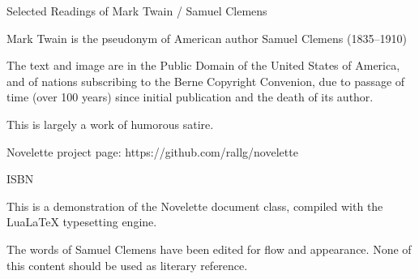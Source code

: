 \documentclass[../interior-demo.tex]{subfiles}
\begin{document}
\begin{display} %
\null\null\null\null\null
{} %
\null\null\null
{}
\vfill %
\end{display}

\begin{display} %
\vfill %
{\centering Selected Readings of Mark Twain\br
/ Samuel Clemens\par}
\null %
{\centering Mark Twain is the pseudonym of American\br
author Samuel Clemens (1835--1910)\par}
\null
{\centering The text and image are in the Public Domain\br
of the United States of America, and of nations\br
subscribing to the Berne Copyright Convenion,\br
due to passage of time (over 100 years) since\br
initial publication and the death of its author.\par}
\null
{\centering This is largely a work of humorous satire.\par}
\null
{\centering Novelette project page:\br
https://github.com/rallg/novelette\par}
\null
{\centering ISBN \par} %
\end{display}


\begin{display} %
\vfil
{}
\null\null\null\null
\begin{blockindent}[2,2]
This is a demonstration of the Novelette document class, compiled
with the LuaLaTeX typesetting engine.\par
\null
The words of Samuel Clemens
have been edited for flow and appearance. None of this content
should be used as literary reference.\par
\end{blockindent}
\vfil
\end{display}

\blankpage %
\end{document}
